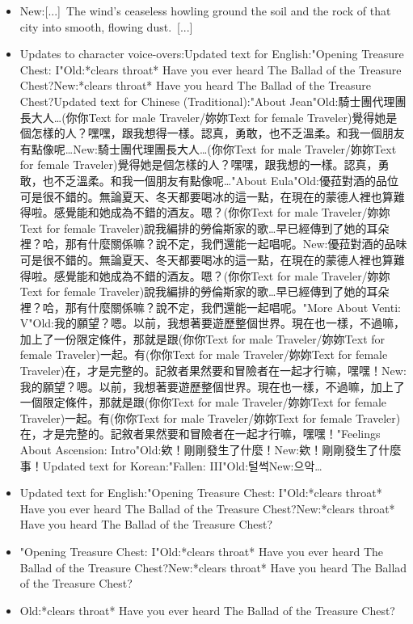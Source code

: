 \documentclass[a4paper,12pt]{article}
\begin{document}
\begin{itemize}
\item New:[...] The wind's ceaseless howling ground the soil and the rock of that city into smooth, flowing dust. [...]
\item Updates to character voice-overs:Updated text for English:"Opening Treasure Chest: I"Old:*clears throat* Have you ever heard The Ballad of the Treasure Chest?New:*clears throat* Have you heard The Ballad of the Treasure Chest?Updated text for Chinese (Traditional):"About Jean"Old:騎士團代理團長大人…(‍你你Text for male Traveler/妳妳Text for female Traveler‍)覺得她是個怎樣的人？嘿嘿，跟我想得一樣。認真，勇敢，也不乏溫柔。和我一個朋友有點像呢…New:騎士團代理團長大人…(‍你你Text for male Traveler/妳妳Text for female Traveler‍)覺得她是個怎樣的人？嘿嘿，跟我想的一樣。認真，勇敢，也不乏溫柔。和我一個朋友有點像呢…"About Eula"Old:優菈對酒的品位可是很不錯的。無論夏天、冬天都要喝冰的這一點，在現在的蒙德人裡也算難得啦。感覺能和她成為不錯的酒友。嗯？(‍你你Text for male Traveler/妳妳Text for female Traveler‍)說我編排的勞倫斯家的歌…早已經傳到了她的耳朵裡？哈，那有什麼關係嘛？說不定，我們還能一起唱呢。New:優菈對酒的品味可是很不錯的。無論夏天、冬天都要喝冰的這一點，在現在的蒙德人裡也算難得啦。感覺能和她成為不錯的酒友。嗯？(‍你你Text for male Traveler/妳妳Text for female Traveler‍)說我編排的勞倫斯家的歌…早已經傳到了她的耳朵裡？哈，那有什麼關係嘛？說不定，我們還能一起唱呢。"More About Venti: V"Old:我的願望？嗯。以前，我想著要遊歷整個世界。現在也一樣，不過嘛，加上了一份限定條件，那就是跟(‍你你Text for male Traveler/妳妳Text for female Traveler‍)一起。有(‍你你Text for male Traveler/妳妳Text for female Traveler‍)在，才是完整的。記敘者果然要和冒險者在一起才行嘛，嘿嘿！New:我的願望？嗯。以前，我想著要遊歷整個世界。現在也一樣，不過嘛，加上了一個限定條件，那就是跟(‍你你Text for male Traveler/妳妳Text for female Traveler‍)一起。有(‍你你Text for male Traveler/妳妳Text for female Traveler‍)在，才是完整的。記敘者果然要和冒險者在一起才行嘛，嘿嘿！"Feelings About Ascension: Intro"Old:欸！剛剛發生了什麼！New:欸！剛剛發生了什麼事！Updated text for Korean:"Fallen: III"Old:털썩New:으악…
\item Updated text for English:"Opening Treasure Chest: I"Old:*clears throat* Have you ever heard The Ballad of the Treasure Chest?New:*clears throat* Have you heard The Ballad of the Treasure Chest?
\item "Opening Treasure Chest: I"Old:*clears throat* Have you ever heard The Ballad of the Treasure Chest?New:*clears throat* Have you heard The Ballad of the Treasure Chest?
\item Old:*clears throat* Have you ever heard The Ballad of the Treasure Chest?

\end{itemize}
\end{document}
